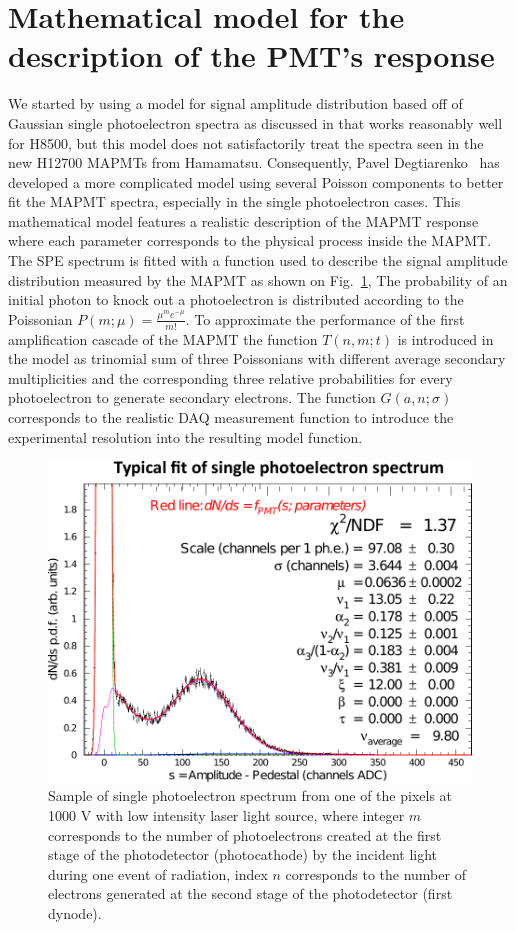 \section{Mathematical model for the description of the PMT's response}


We started by using a model for signal amplitude distribution based off of Gaussian single photoelectron spectra as discussed in \cite{Bellamy:1994bv} that works reasonably well for H8500, but this model does not satisfactorily treat the spectra seen in the new H12700 MAPMTs from Hamamatsu. Consequently, Pavel Degtiarenko~\cite{DEGTIARENKO20171} has developed a more complicated model using several Poisson components to better fit the MAPMT spectra, especially in the single photoelectron cases.
This mathematical model features a realistic description of the MAPMT response where each parameter corresponds to the physical process inside the MAPMT.
The SPE spectrum is fitted with a function used to describe the signal amplitude distribution measured by the MAPMT as shown on Fig.~\ref{fig:SPEfit},
The probability of an initial photon to knock out a photoelectron is distributed according to the Poissonian $P(m;\mu)=\frac{\mu^me^{-\mu}}{m!}$.
To approximate the performance of the first amplification cascade of the MAPMT the function $T(n,m;t)$ is introduced in the model as trinomial sum of three Poissonians with different average secondary multiplicities and the corresponding three relative probabilities for every photoelectron to generate secondary electrons.
The function $G(a,n;\sigma)$ corresponds to the realistic DAQ measurement function to introduce the experimental resolution into the resulting model function.

\begin{figure}[bt]
	\centering
	\includegraphics[width=\linewidth]{figures/SPEfit.pdf}
	\caption{Sample of single photoelectron spectrum from one of the pixels at 1000 V with low intensity laser light source,
where integer $m$ corresponds to the number of photoelectrons created at the first stage of the photodetector (photocathode) by the incident light during one event of radiation, index $n$ corresponds to the number of electrons generated at the second stage of the photodetector (first dynode).
}
\label{fig:SPEfit}
\end{figure}

